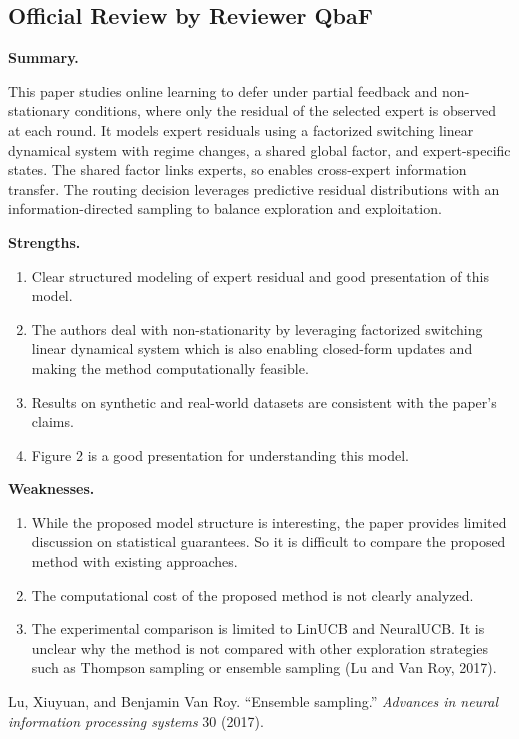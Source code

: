 \subsection*{Official Review by Reviewer QbaF}

\textbf{Summary.}

This paper studies online learning to defer under partial feedback and non-stationary conditions, where only the residual of the selected expert is observed at each round. It models expert residuals using a factorized switching linear dynamical system with regime changes, a shared global factor, and expert-specific states. The shared factor links experts, so enables cross-expert information transfer. The routing decision leverages predictive residual distributions with an information-directed sampling to balance exploration and exploitation.

\textbf{Strengths.}
\begin{enumerate}
    \item Clear structured modeling of expert residual and good presentation of this model.
    \item The authors deal with non-stationarity by leveraging factorized switching linear dynamical system which is also enabling closed-form updates and making the method computationally feasible.
    \item Results on synthetic and real-world datasets are consistent with the paper's claims.
    \item Figure 2 is a good presentation for understanding this model.
\end{enumerate}

\textbf{Weaknesses.}
\begin{enumerate}
    \item While the proposed model structure is interesting, the paper provides limited discussion on statistical guarantees. So it is difficult to compare the proposed method with existing approaches.
    \item The computational cost of the proposed method is not clearly analyzed.
    \item The experimental comparison is limited to LinUCB and NeuralUCB. It is unclear why the method is not compared with other exploration strategies such as Thompson sampling or ensemble sampling (Lu and Van Roy, 2017).
\end{enumerate}

Lu, Xiuyuan, and Benjamin Van Roy. ``Ensemble sampling.'' \textit{Advances in neural information processing systems} 30 (2017).

